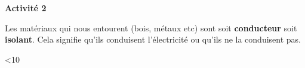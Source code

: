 \documentclass[10pt]{article}
\newcommand{\titre}{Activité 2} %
\newcommand{\sep}{-2.5pt} %
\newcommand{\DoItNTimes}{10} %
\begin{document}
\thispagestyle{fancy}
\cfoot{}


\setcounter{int}{1}
\loop

\begin{mybox}{\textbf{\titre}}    
    \setlength\parindent{4pt} %
    \setlength\parskip{5pt} 

    Les matériaux qui nous entourent (bois, métaux etc) sont soit \textbf{\color{DarkRed} {conducteur}} soit \textbf{\color{DarkRed} {isolant}}.
    Cela signifie qu'ils conduisent l'électricité ou qu'ils ne la conduisent pas.

\end{mybox}

\vspace{\sep}

\addtocounter{int}{1}
\ifnum\value{int}<\DoItNTimes\repeat
\end{document}
